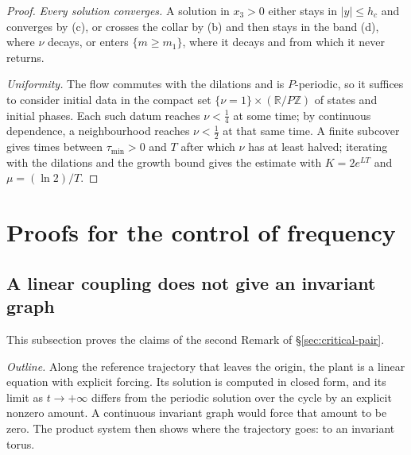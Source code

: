 \documentclass[11pt,reqno]{amsart}
\theoremstyle{plain}
\theoremstyle{definition}
\theoremstyle{remark}
\begin{document}
\begin{proof}
\emph{Every solution converges.} A solution in $x_3>0$ either stays in $|y|\le h_c$ and converges by (c), or
crosses the collar by (b) and then stays in the band (d), where $\nu$ decays, or enters $\{m\ge m_1\}$, where it
decays and from which it never returns.

\emph{Uniformity.} The flow commutes with the dilations and is $P$-periodic, so it suffices to consider initial
data in the compact set $\{\nu=1\}\times(\mathbb R/P\mathbb Z)$ of states and initial phases. Each such datum reaches
$\nu<\frac14$ at some time; by continuous dependence, a neighbourhood reaches $\nu<\frac12$ at that same time.
A finite subcover gives times between $\tau_{\min}>0$ and $T$ after which $\nu$ has at least halved; iterating with
the dilations and the growth bound gives the estimate with $K=2e^{LT}$ and $\mu=(\ln2)/T$.
\end{proof}

\section{Proofs for the control of frequency}\label{app:frequency}

\subsection{A linear coupling does not give an invariant graph}\label{app:no-graph}
This subsection proves the claims of the second Remark of \S\ref{sec:critical-pair}.

\emph{Outline.} Along the reference trajectory that leaves the origin, the plant is a linear equation with
explicit forcing. Its solution is computed in closed form, and its limit as $t\to+\infty$ differs from the
periodic solution over the cycle by an explicit nonzero amount. A continuous invariant graph would force that
amount to be zero. The product system then shows where the trajectory goes: to an invariant torus.
\end{document}
